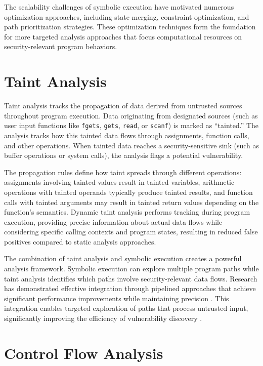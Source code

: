 The scalability challenges of symbolic execution have motivated numerous optimization approaches, including state merging, constraint optimization, and path prioritization strategies. These optimization techniques form the foundation for more targeted analysis approaches that focus computational resources on security-relevant program behaviors.

\section{Taint Analysis}

Taint analysis tracks the propagation of data derived from untrusted sources throughout program execution. Data originating from designated sources (such as user input functions like \texttt{fgets}, \texttt{gets}, \texttt{read}, or \texttt{scanf}) is marked as ``tainted.'' The analysis tracks how this tainted data flows through assignments, function calls, and other operations. When tainted data reaches a security-sensitive sink (such as buffer operations or system calls), the analysis flags a potential vulnerability.

The propagation rules define how taint spreads through different operations: assignments involving tainted values result in tainted variables, arithmetic operations with tainted operands typically produce tainted results, and function calls with tainted arguments may result in tainted return values depending on the function's semantics. Dynamic taint analysis performs tracking during program execution, providing precise information about actual data flows while considering specific calling contexts and program states, resulting in reduced false positives compared to static analysis approaches.

The combination of taint analysis and symbolic execution creates a powerful analysis framework. Symbolic execution can explore multiple program paths while taint analysis identifies which paths involve security-relevant data flows. Research has demonstrated effective integration through pipelined approaches that achieve significant performance improvements while maintaining precision \cite{ming_taintpipe_2015}. This integration enables targeted exploration of paths that process untrusted input, significantly improving the efficiency of vulnerability discovery \cite{newsome_dynamic_2005}.

\section{Control Flow Analysis}

